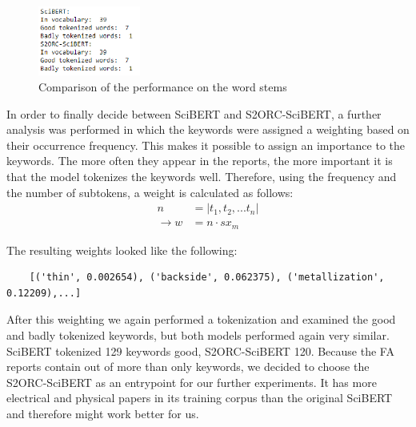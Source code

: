 \begin{figure}[H]
	\centering
	\includegraphics[width=0.3\textwidth]{figures/wordstems_comparison.PNG}
	\caption{Comparison of the performance on the word stems}
	\label{fig:stemming_performance}
\end{figure}

\alert{In order to finally decide between SciBERT and S2ORC-SciBERT, a further analysis was performed in which the keywords were assigned a weighting based on their occurrence frequency. This makes it possible to assign an importance to the keywords. The more often they appear in the reports, the more important it is that the model tokenizes the keywords well. Therefore, using the frequency and the number of subtokens, a weight is calculated as follows:}
\begin{align}
	n &= |t_1, t_2, ... t_n| \\
	\to w &= n \cdot sx_m
\end{align}

The resulting weights looked like the following:
\begin{verbatim}
	[('thin', 0.002654), ('backside', 0.062375), ('metallization', 0.12209),...]
\end{verbatim}

After this weighting we again performed a tokenization and examined the good and badly tokenized keywords, but both models performed again very similar. SciBERT tokenized 129 keywords good, S2ORC-SciBERT 120. Because the FA reports contain out of more than only keywords, we decided to choose the S2ORC-SciBERT as an entrypoint for our further experiments. It has more electrical and physical papers in its training corpus than the original SciBERT and therefore might work better for us.